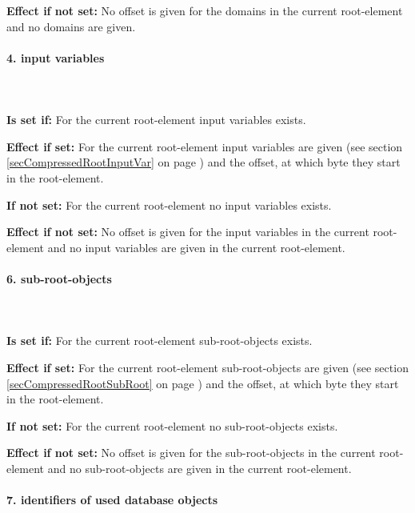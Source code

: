 \bigskip\noindent
\textbf{Effect if not set:}
No offset is given for the domains in the current root-element and no domains are given.


\paragraph{4. input variables}

\ \\\\\noindent
\textbf{Is set if:} For the current root-element input variables exists.

\bigskip\noindent
\textbf{Effect if set:}
For the current root-element input variables are given (see section \ref{secCompressedRootInputVar} on page \pageref{secCompressedRootInputVar}) and the offset, at which byte they start in the root-element.

\bigskip\noindent
\textbf{If not set:} For the current root-element no input variables exists.

\bigskip\noindent
\textbf{Effect if not set:}
No offset is given for the input variables in the current root-element and no input variables are given in the current root-element.


\paragraph{6. sub-root-objects}

\ \\\\\noindent
\textbf{Is set if:} For the current root-element sub-root-objects exists.

\bigskip\noindent
\textbf{Effect if set:}
For the current root-element sub-root-objects are given (see section \ref{secCompressedRootSubRoot} on page \pageref{secCompressedRootSubRoot}) and the offset, at which byte they start in the root-element.

\bigskip\noindent
\textbf{If not set:} For the current root-element no sub-root-objects exists.

\bigskip\noindent
\textbf{Effect if not set:}
No offset is given for the sub-root-objects in the current root-element and no sub-root-objects are given in the current root-element.


\paragraph{7. identifiers of used database objects}

